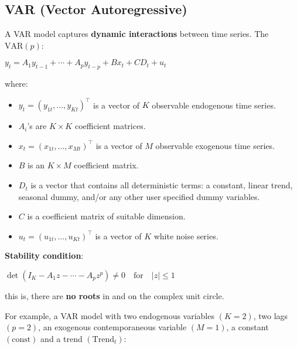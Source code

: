 \documentclass[10pt, a4paper, landscape]{article}
\newcommand{\trend}{\text{Trend}_{t}}
\newcommand{\const}{\text{const}}
\begin{document}
\begin{multicols}{2}

\section*{VAR (Vector Autoregressive)}

A VAR model captures \textbf{dynamic interactions} between time series. The \( \text{VAR}(p) \):

\begin{center}
	\( y_{t} = A_{1} y_{t - 1} + \cdots + A_{p} y_{t - p} + B x_{t} + CD_{t} + u_{t} \)
\end{center}

where:

\begin{itemize}[leftmargin=*]
	\item \( y_{t} = (y_{1t}, \ldots, y_{Kt})^{\top} \) is a vector of \( K \) observable endogenous time series.
	\item \( A_{i} \)'s are \( K \times K \) coefficient matrices.
	\item \( x_{t} = (x_{1t}, \ldots, x_{Mt})^{\top} \) is a vector of \( M \) observable exogenous time series.
	\item \( B \) is an \( K \times M \) coefficient matrix.
	\item \( D_{t} \) is a vector that contains all deterministic terms: a constant, linear trend, seasonal dummy, and/or any other user specified dummy variables.
	\item \( C \) is a coefficient matrix of suitable dimension.
	\item \( u_{t} = (u_{1t}, \ldots, u_{Kt})^{\top} \) is a vector of \( K \) white noise series.
\end{itemize}

\textbf{Stability condition}:

\begin{center}
	\( \det(I_{K} - A_{1} z - \cdots - A_{p} z^{p}) \neq 0 \quad \text{for}\quad \lvert z \rvert \leq 1 \)
\end{center}

\quad this is, there are \textbf{no roots} in and on the complex unit circle.

For example, a VAR model with two endogenous variables \( (K = 2) \), two lags \( (p = 2) \), an exogenous contemporaneous variable \( (M = 1) \), a constant \( (\const) \) and a trend \( (\trend) \):


\end{multicols}
\end{document}
